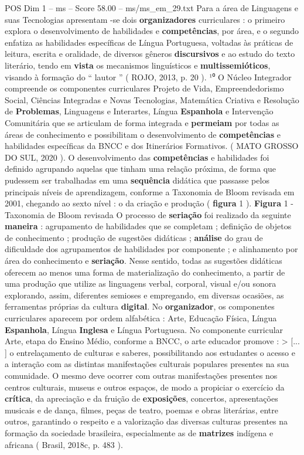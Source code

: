 \begin{textsample}{POS Dim 1 – ms – Score 58.00 – ms/ms\_em\_29.txt}
Para a área de Linguagens e suas Tecnologias apresentam -se dois \textbf{organizadores} curriculares : o primeiro explora o desenvolvimento de habilidades e \textbf{competências}, por área, e o segundo enfatiza as habilidades específicas de Língua Portuguesa, voltadas às práticas de leitura, escrita e oralidade, de diversos gêneros \textbf{discursivos} e ao estudo do texto literário, tendo em \textbf{vista} os mecanismos linguísticos e \textbf{multissemióticos}, visando à formação do “ lautor ” ( ROJO, 2013, p. 20 ). ¹⁰ O Núcleo Integrador compreende os componentes curriculares Projeto de Vida, Empreendedorismo Social, Ciências Integradas e Novas Tecnologias, Matemática Criativa e Resolução de \textbf{Problemas}, Linguagens e Interartes, Língua \textbf{Espanhola} e Intervenção Comunitária que se articulam de forma integrada e \textbf{permeiam} por todas as áreas de conhecimento e possibilitam o desenvolvimento de \textbf{competências} e habilidades específicas da BNCC e dos Itinerários Formativos. ( MATO GROSSO DO SUL, 2020 ).
O desenvolvimento das \textbf{competências} e habilidades foi definido agrupando aquelas que tinham uma relação próxima, de forma que pudessem ser trabalhadas em uma \textbf{sequência} didática que passasse pelos principais níveis de aprendizagem, conforme a Taxonomia de Bloom revisada em 2001, chegando ao sexto nível : o da criação e produção ( \textbf{figura} 1 ). \textbf{Figura} 1 - Taxonomia de Bloom revisada O processo de \textbf{seriação} foi realizado da seguinte \textbf{maneira} : agrupamento de habilidades que se completam ; definição de objetos de conhecimento ; produção de sugestões didáticas ; \textbf{análise} do grau de dificuldade dos agrupamentos de habilidades por componente ; e alinhamento por área do conhecimento e \textbf{seriação}.
Nesse sentido, todas as sugestões didáticas oferecem ao menos uma forma de materialização do conhecimento, a partir de uma produção que utilize as linguagens verbal, corporal, visual e/ou sonora explorando, assim, diferentes semioses e empregando, em diversas ocasiões, as ferramentas próprias da cultura \textbf{digital}.
No \textbf{organizador}, os componentes curriculares aparecem por ordem alfabética : Arte, Educação Física, Língua \textbf{Espanhola}, Língua \textbf{Inglesa} e Língua Portuguesa.
No componente curricular Arte, etapa do Ensino Médio, conforme a BNCC, o arte educador promove : > [... ] o entrelaçamento de culturas e saberes, possibilitando aos estudantes o acesso e a interação com as distintas manifestações culturais populares presentes na sua comunidade.
O mesmo deve ocorrer com outras manifestações presentes nos centros culturais, museus e outros espaços, de modo a propiciar o exercício da \textbf{crítica}, da apreciação e da fruição de \textbf{exposições}, concertos, apresentações musicais e de dança, filmes, peças de teatro, poemas e obras literárias, entre outros, garantindo o respeito e a valorização das diversas culturas presentes na formação da sociedade brasileira, especialmente as de \textbf{matrizes} indígena e africana ( Brasil, 2018c, p. 483 ).

\end{textsample}
